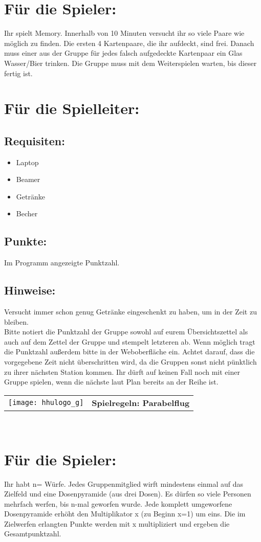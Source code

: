 \documentclass[a4paper,10pt]{article}
\def\spielh{Parabelflug}
\newcommand{\unten}{
 Bitte notiert die Punktzahl der Gruppe sowohl auf eurem Übersichtszettel als auch auf dem Zettel der Gruppe und stempelt letzteren ab. Wenn möglich tragt die Punktzahl außerdem bitte in der Weboberfläche ein.
 Achtet darauf, dass die vorgegebene Zeit nicht überschritten wird, da die Gruppen sonst nicht pünktlich zu ihrer nächsten Station kommen. Ihr dürft auf keinen Fall noch mit einer Gruppe spielen, wenn die nächste laut Plan bereits an der Reihe ist.
}
\begin{document}
\Large
\section*{Für die Spieler:}
Ihr spielt Memory. Innerhalb von 10 Minuten versucht ihr so viele Paare wie möglich zu finden. Die ersten 4 Kartenpaare, die ihr aufdeckt, sind frei. Danach muss einer aus der Gruppe für jedes falsch aufgedeckte Kartenpaar ein Glas Wasser/Bier trinken. Die Gruppe muss mit dem Weiterspielen warten, bis dieser fertig ist.

\section*{Für die Spielleiter:}
\subsection*{Requisiten:} 
\begin{itemize}
 \item Laptop
 \item Beamer
 \item Getränke
 \item Becher
\end{itemize}
\subsection*{Punkte:}
Im Programm angezeigte Punktzahl.

\subsection*{Hinweise:}
Versucht immer schon genug Getränke eingeschenkt zu haben, um in der Zeit zu bleiben.\\
\unten

\newpage


  \begin{tabularx}{\textwidth}{lc}
    \texttt{[image: hhulogo\_g]}
  & {\Huge \textbf{Spielregeln: \spielh}}
  \end{tabularx}\\


\Large
\section*{Für die Spieler:}
Ihr habt n=\underline{\hspace{1cm}} Würfe. Jedes Gruppenmitglied wirft mindestens einmal auf das Zielfeld und eine Dosenpyramide (aus drei Dosen). Es dürfen so viele Personen mehrfach werfen, bis n-mal geworfen wurde. Jede komplett umgeworfene Dosenpyramide erhöht den Multiplikator x (zu Beginn x=1) um eins. Die im Zielwerfen erlangten Punkte werden mit x multipliziert und ergeben die Gesamtpunktzahl.
\end{document}
